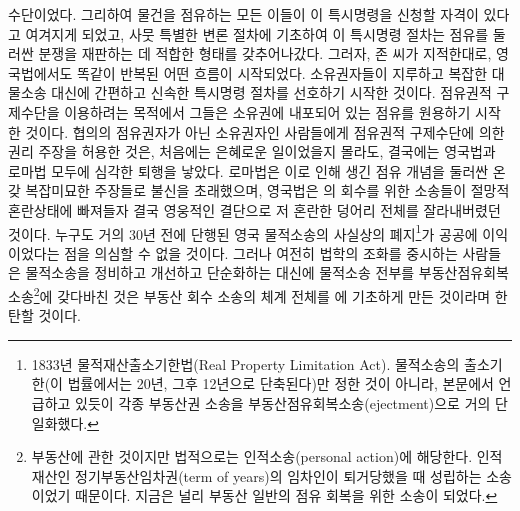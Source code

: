 수단이었다.
그리하여 물건을 
점유하는 모든 이들이 이 특시명령을 신청할 자격이 있다고
여겨지게 되었고,
사뭇 특별한 변론 절차에 기초하여
이 특시명령 절차는 점유를 둘러싼 분쟁을 재판하는 데 적합한 형태를
갖추어나갔다.
그러자, 존  씨가 지적한대로,
영국법에서도 똑같이 반복된 어떤 흐름이 시작되었다.
소유권자들이
지루하고 복잡한 대물소송 대신에
간편하고 신속한 특시명령 절차를 선호하기 시작한 것이다.
점유권적 구제수단을 이용하려는 목적에서
그들은 소유권에 내포되어 있는 점유를 원용하기 시작한 것이다.
협의의 점유권자가 아닌 소유권자인 사람들에게
점유권적 구제수단에 의한 권리 주장을 허용한 것은,
처음에는 은혜로운 일이었을지 몰라도,
결국에는 영국법과 로마법 모두에 심각한 퇴행을 낳았다.
로마법은
이로 인해 생긴
점유 개념을 둘러싼 온갖 복잡미묘한 주장들로
불신을 초래했으며,
영국법은
의 회수를 위한 소송들이
절망적 혼란상태에 빠져들자
결국 영웅적인 결단으로
저 혼란한 덩어리 전체를 잘라내버렸던 것이다.
누구도 거의 30년 전에 단행된
영국 물적소송의 사실상의 폐지\footnote{%
  1833년 물적재산출소기한법(Real Property Limitation Act).
  물적소송의 출소기한(이 법률에서는 20년, 그후 12년으로 단축된다)만
  정한 것이 아니라, 본문에서 언급하고 있듯이
  각종 부동산권 소송을 부동산점유회복소송(ejectment)으로 거의 단일화했다.
}가 공공에 이익이었다는 점을 의심할 수 없을 것이다.
그러나 여전히
법학의 조화를 중시하는 사람들은
물적소송을
정비하고 개선하고 단순화하는 대신에
물적소송 전부를 부동산점유회복소송\footnote{%
  부동산에 관한 것이지만 법적으로는 인적소송(personal action)에
  해당한다. 인적재산인 정기부동산임차권(term of years)의 임차인이
  퇴거당했을 때 성립하는 소송이었기 때문이다.
  지금은 널리 부동산 일반의 점유 회복을 위한 소송이 되었다.
}에 갖다바친 것은
부동산 회수 소송의 체계 전체를 에 기초하게 만든 것이라며
한탄할 것이다.

